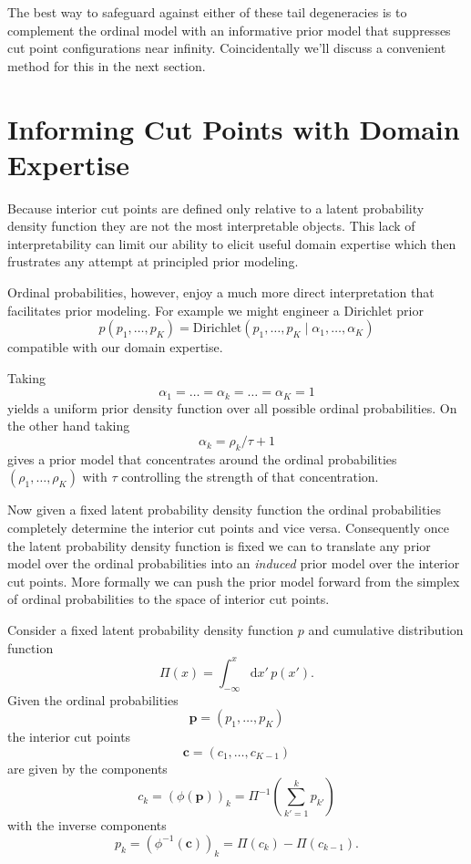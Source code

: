 \documentclass[
  letterpaper,
  DIV=11,
  numbers=noendperiod]{scrartcl}
\begin{document}
The best way to safeguard against either of these tail degeneracies is
to complement the ordinal model with an informative prior model that
suppresses cut point configurations near infinity. Coincidentally we'll
discuss a convenient method for this in the next section.

\section{Informing Cut Points with Domain
Expertise}\label{informing-cut-points-with-domain-expertise}

Because interior cut points are defined only relative to a latent
probability density function they are not the most interpretable
objects. This lack of interpretability can limit our ability to elicit
useful domain expertise which then frustrates any attempt at principled
prior modeling.

Ordinal probabilities, however, enjoy a much more direct interpretation
that facilitates prior modeling. For example we might engineer a
Dirichlet prior \[
p( p_{1}, \ldots, p_{K} )
=
\text{Dirichlet}( p_{1}, \ldots, p_{K} \mid
                  \alpha_{1}, \ldots, \alpha_{K})
\] compatible with our domain expertise.

Taking \[
\alpha_{1} = \ldots = \alpha_{k} = \ldots = \alpha_{K} = 1
\] yields a uniform prior density function over all possible ordinal
probabilities. On the other hand taking \[
\alpha_{k} = \rho_{k} / \tau + 1
\] gives a prior model that concentrates around the ordinal
probabilities \((\rho_{1}, \ldots, \rho_{K})\) with \(\tau\) controlling
the strength of that concentration.

Now given a fixed latent probability density function the ordinal
probabilities completely determine the interior cut points and vice
versa. Consequently once the latent probability density function is
fixed we can to translate any prior model over the ordinal probabilities
into an \emph{induced} prior model over the interior cut points. More
formally we can push the prior model forward from the simplex of ordinal
probabilities to the space of interior cut points.

Consider a fixed latent probability density function \(p\) and
cumulative distribution function \[
\Pi(x) = \int_{-\infty}^{x} \mathrm{d} x' \, p(x').
\] Given the ordinal probabilities \[
\mathbf{p} = (p_{1}, \ldots, p_{K})
\] the interior cut points \[
\mathbf{c} = (c_{1}, \ldots, c_{K - 1})
\] are given by the components \[
c_{k}
=
\left( \phi( \mathbf{p} ) \right)_{k}
=
\Pi^{-1} \left( \sum_{k' = 1}^{k} p_{k'} \right)
\] with the inverse components \[
p_{k}
=
\left( \phi^{-1}( \mathbf{c} ) \right)_{k}
=
\Pi(c_{k}) - \Pi(c_{k - 1}).
\]
\end{document}
